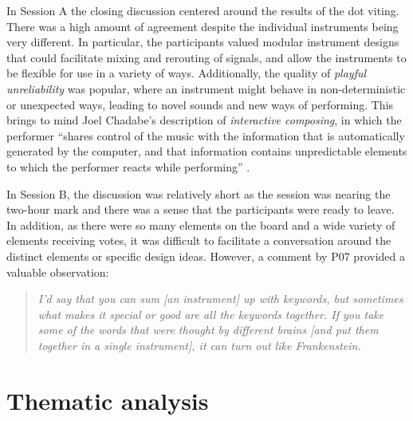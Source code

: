 \documentclass[letterpaper, 12pt]{article}
\begin{document}
In Session A the closing discussion centered around the results of the dot viting. There was a high amount of agreement despite the individual instruments being very different. In particular, the participants valued modular instrument designs that could facilitate mixing and rerouting of signals, and allow the instruments to be flexible for use in a variety of ways. Additionally, the quality of \emph{playful unreliability} was popular, where an instrument might behave in non-deterministic or unexpected ways, leading to novel sounds and new ways of performing. 
This brings to mind Joel Chadabe's description of \emph{interactive composing}, in which the performer ``shares control of the music with the information that is automatically generated by the computer, and that information contains unpredictable elements to which the performer reacts while performing'' \citep[p. 23]{Chadabe1984}. 

In Session B, the discussion was relatively short as the session was nearing the two-hour mark and there was a sense that the participants were ready to leave. In addition, as there were so many elements on the board and a wide variety of elements receiving votes, it was difficult to facilitate a conversation around the distinct elements or specific design ideas. However, a comment by P07 provided a valuable observation:  

\begin{quote}
   \emph{ I'd say that you can sum [an instrument] up with keywords, but sometimes what makes it special or good are all the keywords together. If you take some of the words that were thought by different brains [and put them together in a single instrument], it can turn out like Frankenstein.}
\end{quote}

\section{Thematic analysis}
\label{ch3-sec:thematic-analysis}
\end{document}
